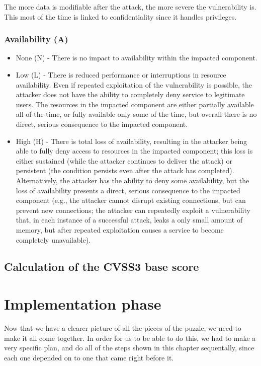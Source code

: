 The more data is modifiable after the attack, the more severe the vulnerability is. This most of the time is linked to confidentiality since it handles privileges.

\subsubsection{Availability (A)}

\begin{itemize}
	\item None (N) - There is no impact to availability within the impacted component.
	\item Low (L) - There is reduced performance or interruptions in resource availability. Even if repeated exploitation of the vulnerability is possible, the attacker does not have the ability to completely deny service to legitimate users. The resources in the impacted component are either partially available all of the time, or fully available only some of the time, but overall there is no direct, serious consequence to the impacted component.
	\item High (H) - There is total loss of availability, resulting in the attacker being able to fully deny access to resources in the impacted component; this loss is either sustained (while the attacker continues to deliver the attack) or persistent (the condition persists even after the attack has completed). Alternatively, the attacker has the ability to deny some availability, but the loss of availability presents a direct, serious consequence to the impacted component (e.g., the attacker cannot disrupt existing connections, but can prevent new connections; the attacker can repeatedly exploit a vulnerability that, in each instance of a successful attack, leaks a only small amount of memory, but after repeated exploitation causes a service to become completely unavailable).
\end{itemize}

\subsection{Calculation of the CVSS3 base score}


\section{Implementation phase}

Now that we have a clearer picture of all the pieces of the puzzle, we need to make it all come together. In order for us to be able to do this, we had to make a very specific plan, and do all of the steps shown in this chapter sequentally, since each one depended on to one that came right before it.

